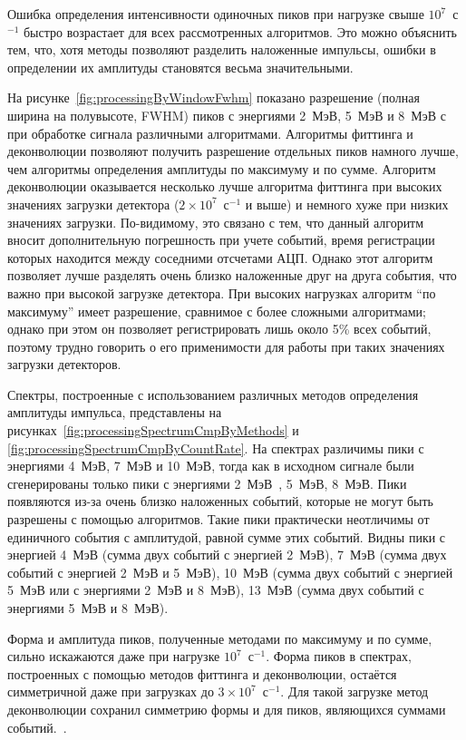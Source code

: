 Ошибка определения интенсивности одиночных пиков при нагрузке свыше $10^7$~с${}^{-1}$ быстро возрастает для всех рассмотренных алгоритмов. Это можно объяснить тем, что, хотя методы позволяют разделить наложенные импульсы, ошибки в определении их амплитуды становятся весьма значительными.

На рисунке~\ref{fig:processingByWindowFwhm} показано разрешение (полная ширина на полувысоте, FWHM) пиков с энергиями 2~МэВ, 5~МэВ и 8~МэВ с при обработке сигнала различными алгоритмами. Алгоритмы фиттинга и деконволюции позволяют получить разрешение отдельных пиков намного лучше, чем алгоритмы определения амплитуды по максимуму и  по сумме. Алгоритм деконволюции оказывается несколько лучше алгоритма фиттинга при высоких значениях загрузки детектора ($2 \times 10^7$~с${}^{-1}$ и выше) и немного хуже при низких значениях загрузки. По-видимому, это связано с тем, что данный алгоритм вносит дополнительную погрешность при учете событий, время регистрации которых находится между соседними отсчетами АЦП. Однако этот алгоритм позволяет лучше разделять очень близко наложенные друг на друга события, что важно при высокой загрузке детектора. При высоких нагрузках  алгоритм ``по максимуму'' имеет разрешение, сравнимое с более сложными алгоритмами; однако при этом он позволяет регистрировать лишь около 5\% всех событий, поэтому трудно говорить о его применимости для работы при таких значениях загрузки детекторов.

Спектры, построенные с использованием различных методов определения амплитуды импульса, представлены на рисунках~\ref{fig:processingSpectrumCmpByMethods} и \ref{fig:processingSpectrumCmpByCountRate}. На спектрах различимы пики с энергиями 4~МэВ, 7~МэВ и 10~МэВ, тогда как в исходном сигнале были сгенерированы только пики с энергиями 2~МэВ~, 5~МэВ, 8~МэВ. Пики появляются из-за очень близко наложенных событий, которые не могут быть разрешены с помощью алгоритмов. Такие пики практически неотличимы от единичного события с амплитудой, равной сумме этих событий. Видны пики с энергией 4~МэВ (сумма двух событий с энергией 2~МэВ), 7~МэВ (сумма двух событий с энергией 2~МэВ и 5~МэВ), 10~МэВ (сумма двух событий с энергией 5~МэВ или с энергиями 2~МэВ и 8~МэВ), 13~МэВ (сумма двух событий с энергиями 5~МэВ и 8~МэВ).

Форма и амплитуда пиков, полученные методами по максимуму и по сумме, сильно искажаются даже при нагрузке $10^7$~с${}^{-1}$. Форма пиков в спектрах, построенных с помощью методов фиттинга и деконволюции, остаётся симметричной даже при загрузках до $3 \times 10^7$~с${}^{-1}$. Для такой загрузке метод деконволюции сохранил симметрию формы и для пиков, являющихся суммами событий.~\cite{Khilkevitch2020}.

